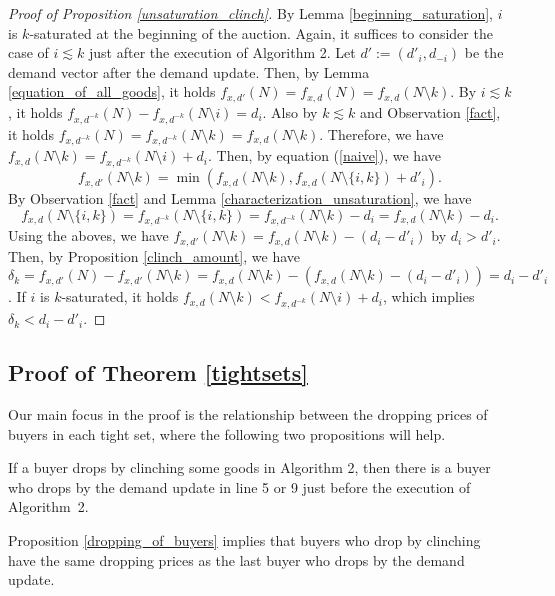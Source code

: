 \documentclass[letterpaper,11pt]{article}
\begin{document}
\begin{proof}[Proof of Proposition \ref{unsaturation_clinch}]
	By Lemma \ref{beginning_saturation}, 
	$i$ is $k$-saturated at the beginning of the auction. 
	Again, it suffices to consider the case of $i\lesssim k$ just after the execution of Algorithm 2.
	Let $d':=(d'_i, d_{-i})$ be the demand vector after the demand update. 
	Then, by Lemma \ref{equation_of_all_goods}, it holds 
	$f_{x,d'}(N)=f_{x,d}(N)=f_{x,d}(N\setminus k)$.
	By $i\lesssim k$, it holds $f_{x,d^{-k}}(N)-f_{x,d^{-k}}(N\setminus i)= d_i$.
	Also by $k\lesssim k$ and Observation \ref{fact}, 
	it holds $f_{x,d^{-k}}(N)=f_{x,d^{-k}}(N\setminus k)=f_{x,d}(N\setminus k)$.
	Therefore, we have $f_{x,d}(N\setminus k)=f_{x,d^{-k}}(N\setminus i)+d_i$.
	Then, 
	by equation (\ref{naive}), we have 
	\[
	f_{x,d'}(N\setminus k)=\min(f_{x,d}(N\setminus k),f_{x,d}(N\setminus \{i,k\})+d'_i).
	\]
	By Observation \ref{fact} and Lemma \ref{characterization_unsaturation}, we have 
	\[
	f_{x,d}(N\setminus \{i,k\})=f_{x,d^{-k}}(N\setminus \{i,k\})=f_{x,d^{-k}}(N\setminus k)-d_i
	=f_{x,d}(N\setminus k)-d_i.
	\]
	Using the aboves, we have $f_{x,d'}(N\setminus k)=f_{x,d}(N\setminus k)-(d_i-d'_i)$ by $d_i>d'_i$.
	Then, by Proposition \ref{clinch_amount}, we have 
	$\delta_k=f_{x,d'}(N)-f_{x,d'}(N\setminus k)=f_{x,d}(N\setminus k)-(f_{x,d}(N\setminus k)-(d_i-d'_i))=d_i-d'_i$.
	If $i$ is $k$-saturated, 
	it holds $f_{x,d}(N\setminus k)<f_{x,d^{-k}}(N\setminus i)+d_i$, 
	which implies $\delta_k<d_i-d'_i$. 
\end{proof}




\subsection{Proof of Theorem \ref{tightsets}}
	
	Our main focus in the proof is the relationship between the dropping prices of buyers in each tight set, 
	where the following two propositions will help. 
	
	\begin{proposition}
	\label{dropping_of_buyers}
	If a buyer drops by clinching some goods in Algorithm 2, then there is a buyer 
	who drops by the demand update in line 5 or 9 
	just before the execution of Algorithm~2.
	\end{proposition}
	
	Proposition \ref{dropping_of_buyers} 
	implies that buyers who drop by clinching have the same dropping prices 
	as the last buyer who drops by the demand update. 
\end{document}
